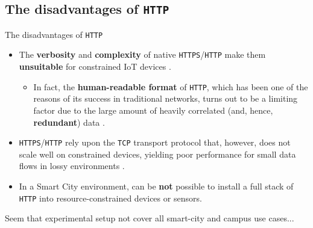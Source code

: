 \documentclass[13.5pt]{beamer}
\begin{document}
\subsection{The disadvantages of \texttt{HTTP}}
\begin{frame}{The disadvantages of \texttt{HTTP}}

\begin{itemize}
\justifying
\item The \textbf{verbosity} and \textbf{complexity} of native \texttt{HTTPS}/\texttt{HTTP} make them \textbf{unsuitable} for constrained IoT devices \cite{IOTCITY}. 

\begin{itemize}
\justifying
\item In fact, the \textbf{human-readable format} of \texttt{HTTP}, which has been one of the reasons of its success in traditional networks, turns out to be a limiting factor due to the large amount of heavily correlated (and, hence, \textbf{redundant}) data \cite{IOTCITY}.
\end{itemize}

\item \texttt{HTTPS}/\texttt{HTTP} rely upon the \texttt{TCP} transport protocol that, however, does not scale well on constrained devices, yielding poor performance for small data flows in lossy environments \cite{IOTCITY}.

\item In a Smart City environment, can be \textbf{not} possible to install a full stack of \texttt{HTTP} into resource-constrained devices or sensors. 
\end{itemize}

\begin{block}{}
\justifying
Seem that experimental setup not cover all smart-city and campus use cases...
\end{block}

\end{frame} 
\end{document}

